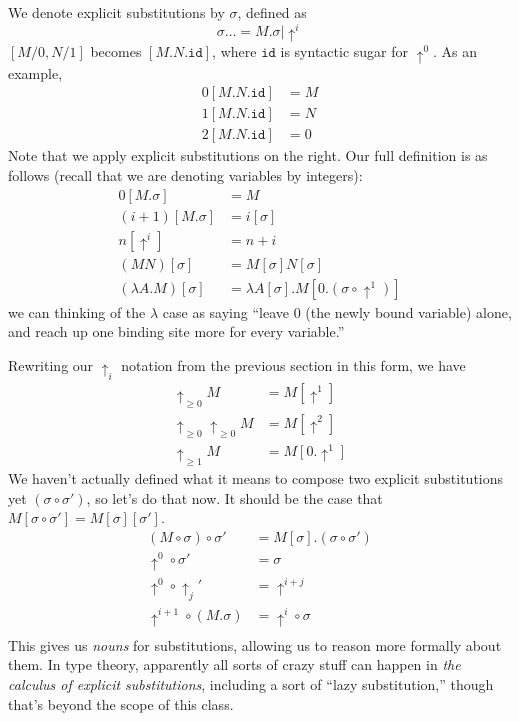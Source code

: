 \documentclass{amsart}
\newcommand{\id}{\ensuremath{\mathtt{id}}}
\begin{document}
We denote explicit substitutions by $\sigma$, defined as
\[
\sigma \dots= M.\sigma | \uparrow^i
\]
$[M/0, N/1]$ becomes $[M.N.\id]$, where $\id$ is syntactic sugar for $\uparrow^0$. As an example,
\begin{align*}
0[M.N.\id] &= M\\
1[M.N.\id] &= N\\
2[M.N.\id] &= 0
\end{align*}
Note that we apply explicit substitutions on the right. Our full definition is as follows (recall that we are denoting variables by integers):
\begin{align*}
0[M.\sigma] &= M\\
(i+1)[M.\sigma] &= i[\sigma]\\
n[\uparrow^i] &= n+i\\
(M N)[\sigma] &= M[\sigma] N [\sigma]\\
(\lambda A. M)[\sigma] &= \lambda A[\sigma]. M[0.(\sigma \circ \uparrow^1)]
\end{align*}
we can thinking of the $\lambda$ case as saying ``leave 0 (the newly bound variable) alone, and reach up one binding site more for every variable.''

Rewriting our $\uparrow_i$ notation from the previous section in this form, we have
\begin{align*}
\uparrow_{\geq 0} M &= M [\uparrow^1]\\
\uparrow_{\geq 0} \uparrow_{\geq 0}M &= M [\uparrow^2]\\
\uparrow_{\geq 1} M &= M [0.\uparrow^1]
\end{align*}
We haven't actually defined what it means to compose two explicit substitutions yet $(\sigma \circ \sigma')$, so let's do that now. It should be the case that $M[\sigma\circ\sigma'] = M[\sigma][\sigma']$.
\begin{align*}
(M\circ\sigma)\circ\sigma' &= M[\sigma].(\sigma\circ\sigma')\\
\uparrow^0\circ\sigma' &= \sigma\\
\uparrow^0\circ\uparrow_j' &= \uparrow^{i+j}\\
\uparrow^{i+1}\circ(M.\sigma) &= \uparrow^{i}\circ\sigma\\
\end{align*}
This gives us \textit{nouns} for substitutions, allowing us to reason more formally about them. In type theory, apparently all sorts of crazy stuff can happen in \textit{the calculus of explicit substitutions}, including a sort of ``lazy substitution,'' though that's beyond the scope of this class.
\end{document}

